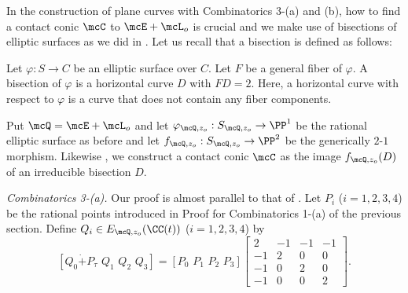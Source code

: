 %
%
%
%
%
%
%
%
%


 In the construction of plane curves with Combinatorics 3-(a) and (b),  how to find a contact conic $\mcC$ to 
 $\mcE + \mcL_o$ is crucial and we make use of bisections of elliptic surfaces as we did in \cite{bannai-tokunaga}.
 Let us recall that  a bisection is defined as follows:
 
 
 \begin{defin}\label{def:bisection}{\rm
 Let $\varphi : S \to C$ be an elliptic surface over $C$. Let $F$ be a general fiber of $\varphi$.
 A bisection of $\varphi$ is a horizontal curve $D$ with $FD = 2$. Here, a horizontal curve
 with respect to $\varphi$ is a curve that does not contain any fiber components.
 }
 \end{defin}

  Put $\mcQ = \mcE + \mcL_o$ and let $\varphi_{\mcQ, z_o} : S_{\mcQ, z_o} 
 \to \PP^1$ be the rational elliptic surface as before and let $f_{\mcQ, z_o} : S_{\mcQ, z_o} \to
 \PP^2$ be the generically $2$-$1$ morphism. Likewise \cite{bannai-tokunaga}, we construct
 a contact conic $\mcC$ as the image $f_{\mcQ, z_o}(D)$ of an irreducible bisection $D$.
  

 
{\sl Combinatorics 3-(a).} Our proof is almost parallel to that of \cite[Proposition 5]{bannai-tokunaga}.
Let $P_i$ ($i = 1, 2, 3, 4$) be the rational points introduced
in Proof for Combinatorics 1-(a) of  the previous section. Define $Q_i \in E_{\mcQ, z_o}(\CC(t))$ 
($i = 1, 2, 3, 4$)
by 
\[
[Q_0\dot{+}P_{\tau}\,\,  Q_1\,\,  Q_2\,\,  Q_3] = [P_0\,\,  P_1\,\,  P_2 \,\,  P_3] 
 \left [ \begin{array}{cccc}
         2 & -1 & -1 & -1 \\
        -1 & 2 & 0 & 0 \\
        -1 & 0 & 2 & 0 \\
        -1 & 0 & 0 & 2
          \end{array}
          \right ].
\]

